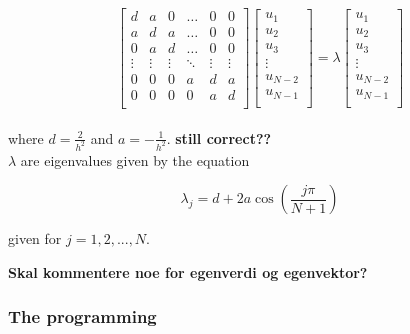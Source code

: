 \documentclass{article}
\begin{document}
    \begin{equation*} \label{eq:fullmatrixeq}
      \begin{bmatrix}
        d & a & 0 & \dots & 0 & 0 \\
        a & d & a & \dots & 0 & 0 \\
        0 & a & d & \dots & 0 & 0 \\
        \vdots & \vdots & \vdots & \ddots & \vdots & \vdots \\
        0 & 0 & 0 & a & d & a \\
        0 & 0 & 0 & 0 & a & d \\
      \end{bmatrix}
      \begin{bmatrix}
        u_1 \\
        u_2 \\
        u_3 \\
        \vdots \\
        u_{N-2} \\
        u_{N-1} \\
      \end{bmatrix}
      = \lambda
      \begin{bmatrix}
        u_1 \\
        u_2 \\
        u_3 \\
        \vdots \\
        u_{N-2} \\
        u_{N-1} \\
      \end{bmatrix}
    \end{equation*} \\

where $d = \frac{2}{h^2}$ and $a = - \frac{1}{h^2}$. \textbf{still correct??} \\

$\lambda$ are eigenvalues given by the equation

\begin{equation*}
    \lambda_j = d + 2a \cos \left( \frac{j \pi }{N + 1} \right)
\end{equation*}

given for $ j = 1, 2, ..., N$.



\textbf{Skal kommentere noe for egenverdi og egenvektor?}

  \subsubsection{The programming}
\end{document}
